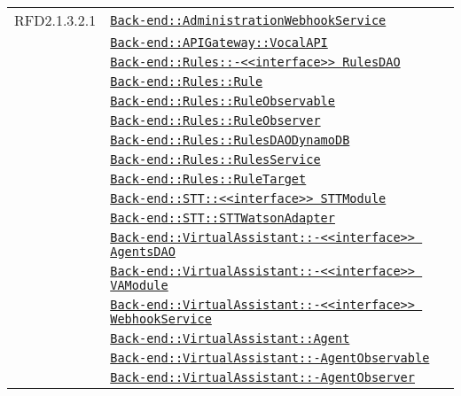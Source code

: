 \begin{longtable}{|>{\centering}m{3cm}|m{10cm}<{\centering}|}
RFD2.1.3.2.1 & \hyperref[Back-end::AdministrationWebhookService]{\texttt{Back-end::AdministrationWebhookService}}\\
& \hyperref[Back-end::APIGateway::VocalAPI]{\texttt{Back-end::APIGateway::VocalAPI}}\\
& \hyperref[Back-end::Rules::<<interface>> RulesDAO]{\texttt{Back-end::Rules::-\linebreak <<interface>> RulesDAO}}\\
& \hyperref[Back-end::Rules::Rule]{\texttt{Back-end::Rules::Rule}}\\
& \hyperref[Back-end::Rules::RuleObservable]{\texttt{Back-end::Rules::RuleObservable}}\\
& \hyperref[Back-end::Rules::RuleObserver]{\texttt{Back-end::Rules::RuleObserver}}\\
& \hyperref[Back-end::Rules::RulesDAODynamoDB]{\texttt{Back-end::Rules::RulesDAODynamoDB}}\\
& \hyperref[Back-end::Rules::RulesService]{\texttt{Back-end::Rules::RulesService}}\\
& \hyperref[Back-end::Rules::RuleTarget]{\texttt{Back-end::Rules::RuleTarget}}\\
& \hyperref[Back-end::STT::<<interface>> STTModule]{\texttt{Back-end::STT::<<interface>> STTModule}}\\
& \hyperref[Back-end::STT::STTWatsonAdapter]{\texttt{Back-end::STT::STTWatsonAdapter}}\\
& \hyperref[Back-end::VirtualAssistant::<<interface>> AgentsDAO]{\texttt{Back-end::VirtualAssistant::-\linebreak <<interface>> AgentsDAO}}\\
& \hyperref[Back-end::VirtualAssistant::<<interface>> VAModule]{\texttt{Back-end::VirtualAssistant::-\linebreak <<interface>> VAModule}}\\
& \hyperref[Back-end::VirtualAssistant::<<interface>> WebhookService]{\texttt{Back-end::VirtualAssistant::-\linebreak <<interface>> WebhookService}}\\
& \hyperref[Back-end::VirtualAssistant::Agent]{\texttt{Back-end::VirtualAssistant::Agent}}\\
& \hyperref[Back-end::VirtualAssistant::AgentObservable]{\texttt{Back-end::VirtualAssistant::-\linebreak AgentObservable}}\\
& \hyperref[Back-end::VirtualAssistant::AgentObserver]{\texttt{Back-end::VirtualAssistant::-\linebreak AgentObserver}}\\

\end{longtable}
